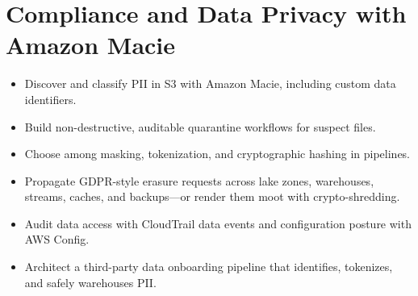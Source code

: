 \chapter{Compliance and Data Privacy with Amazon Macie}
%
\begin{objectives}
\begin{itemize}
    \item Discover and classify PII in S3 with Amazon Macie, including custom data identifiers.
    \item Build non-destructive, auditable quarantine workflows for suspect files.
    \item Choose among masking, tokenization, and cryptographic hashing in pipelines.
    \item Propagate GDPR-style erasure requests across lake zones, warehouses, streams, caches, and backups---or render them moot with crypto-shredding.
    \item Audit data access with CloudTrail data events and configuration posture with AWS Config.
    \item Architect a third-party data onboarding pipeline that identifies, tokenizes, and safely warehouses PII.
\end{itemize}
\end{objectives}

